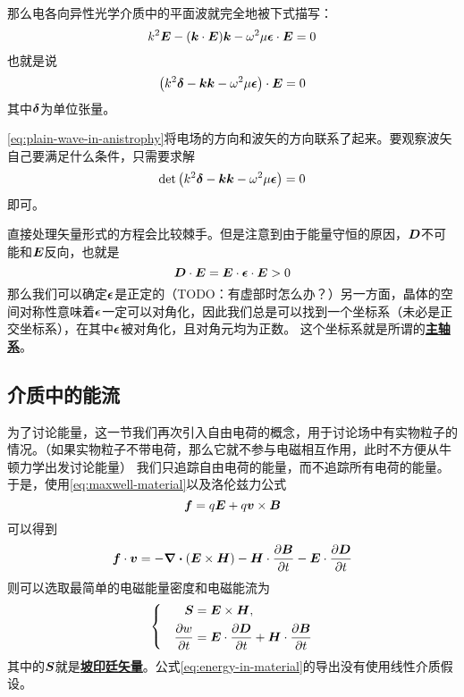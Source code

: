 \documentclass[UTF8, a4paper]{ctexart}
\newcommand*{\concept}[1]{\underline{\textbf{#1}}}
\newenvironment{bigcase}{\left\{\quad\begin{aligned}}{\end{aligned}\right.}
\begin{document}
那么电各向异性光学介质中的平面波就完全地被下式描写：
\[
    k^2 \vb*{E} - (\vb*{k} \cdot \vb*{E}) \vb*{k} - \omega^2 \mu \vb*{\epsilon} \cdot \vb*{E} = 0
\]
也就是说
\begin{equation}
    \left( k^2 \vb*{\delta} - \vb*{k} \vb*{k} - \omega^2 \mu \vb*{\epsilon} \right) \cdot \vb*{E} = 0
    \label{eq:plain-wave-in-anistrophy}
\end{equation}
其中$\vb*{\delta}$为单位张量。

\eqref{eq:plain-wave-in-anistrophy}将电场的方向和波矢的方向联系了起来。要观察波矢自己要满足什么条件，只需要求解
\begin{equation}
    \det \left( k^2 \vb*{\delta} - \vb*{k} \vb*{k} - \omega^2 \mu \vb*{\epsilon} \right) = 0
    \label{eq:k-det}
\end{equation}
即可。

直接处理矢量形式的方程会比较棘手。但是注意到由于能量守恒的原因，$\vb*{D}$不可能和$\vb*{E}$反向，也就是
\[
    \vb*{D} \cdot \vb*{E} = \vb*{E} \cdot \vb*{\epsilon} \cdot \vb*{E} > 0
\]
那么我们可以确定$\vb*{\epsilon}$是正定的（TODO：有虚部时怎么办？）另一方面，晶体的空间对称性意味着$\vb*{\epsilon}$一定可以对角化，因此我们总是可以找到一个坐标系（未必是正交坐标系），在其中$\vb*{\epsilon}$被对角化，且对角元均为正数。
这个坐标系就是所谓的\concept{主轴系}。

\subsection{介质中的能流}

为了讨论能量，这一节我们再次引入自由电荷的概念，用于讨论场中有实物粒子的情况。（如果实物粒子不带电荷，那么它就不参与电磁相互作用，此时不方便从牛顿力学出发讨论能量）
我们只追踪自由电荷的能量，而不追踪所有电荷的能量。
于是，使用\eqref{eq:maxwell-material}以及洛伦兹力公式
\[
    \vb*{f} = q \vb*{E} + q \vb*{v} \times \vb*{B}
\]
可以得到
\[
    \vb*{f} \cdot \vb*{v} = - \div{(\vb*{E} \times \vb*{H})} - \vb*{H} \cdot \pdv{\vb*{B}}{t} - \vb*{E} \cdot \pdv{\vb*{D}}{t}
\]
则可以选取最简单的电磁能量密度和电磁能流为
\begin{equation}
    \begin{bigcase}
        \vb*{S} &= \vb*{E} \times \vb*{H}, \\
        \pdv{w}{t} &= \vb*{E} \cdot \pdv{\vb*{D}}{t} + \vb*{H} \cdot \pdv{\vb*{B}}{t}
    \end{bigcase}
    \label{eq:energy-in-material}
\end{equation}
其中的$\vb*{S}$就是\concept{坡印廷矢量}。公式\eqref{eq:energy-in-material}的导出没有使用线性介质假设。
\end{document}
